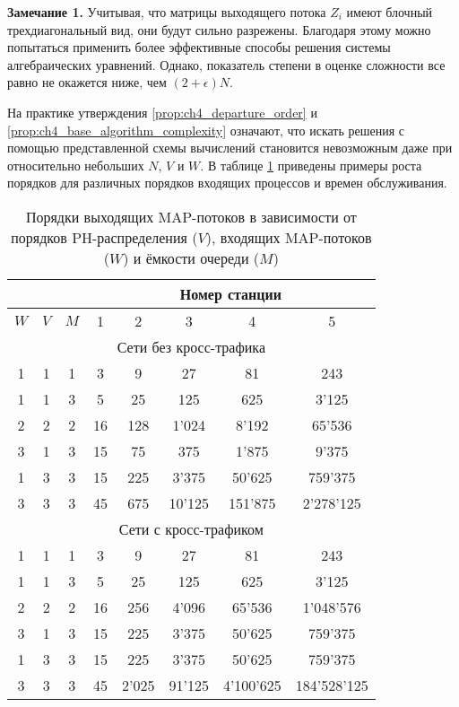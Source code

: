 \textbf{Замечание 1.} Учитывая, что матрицы выходящего потока $Z_i$ имеют блочный трехдиагональный вид, они будут сильно разрежены. Благодаря этому можно попытаться применить более эффективные способы решения системы алгебраических уравнений. Однако, показатель степени в оценке сложности все равно не окажется ниже, чем $(2 + \epsilon) N$.


На практике утверждения \ref{prop:ch4_departure_order} и \ref{prop:ch4_base_algorithm_complexity} означают, что искать решения с помощью представленной схемы вычислений становится невозможным даже при относительно небольших $N$, $V$ и $W$. В таблице \ref{table:ch4_map_order_growth} приведены примеры роста порядков для различных порядков входящих процессов и времен обслуживания.

\begin{table}[h!]
\centering
\begin{tabular}{ |c|c|c||c|c|c|c|c| }
\hline
\multicolumn{3}{|c||}{} & \multicolumn{5}{c|}{Номер станции} \\
\hline
$W$ & $V$ & $M$ & 1 & 2 & 3 & 4 & 5\\
\hline
\multicolumn{8}{|c|}{Сети без кросс-трафика} \\
\hline
1 & 1 & 1 & 3 & 9 & 27 & 81 & 243 \\
1 & 1 & 3 & 5 & 25 & 125 & 625 & 3'125 \\
2 & 2 & 2 & 16 & 128 & 1'024 & 8'192 & 65'536 \\
3 & 1 & 3 & 15 & 75 & 375 & 1'875 & 9'375 \\
1 & 3 & 3 & 15 & 225 & 3'375 & 50'625 & 759'375 \\
3 & 3 & 3 & 45 & 675 & 10'125 & 151'875 & 2'278'125 \\
\hline
\multicolumn{8}{|c|}{Сети с кросс-трафиком} \\
\hline
1 & 1 & 1 & 3 & 9 & 27 & 81 & 243 \\
1 & 1 & 3 & 5 & 25 & 125 & 625 & 3'125 \\
2 & 2 & 2 & 16 & 256 & 4'096 & 65'536 & 1'048'576 \\
3 & 1 & 3 & 15 & 225 & 3'375 & 50'625 & 759'375 \\
1 & 3 & 3 & 15 & 225 & 3'375 & 50'625 & 759'375 \\
3 & 3 & 3 & 45 & 2'025 & 91'125 & 4'100'625 & 184'528'125 \\
\hline
\end{tabular}
\caption{Порядки выходящих MAP-потоков в зависимости от порядков PH-распределения ($V$), входящих MAP-потоков ($W$) и ёмкости очереди ($M$)\label{table:ch4_map_order_growth}
}
\end{table}


